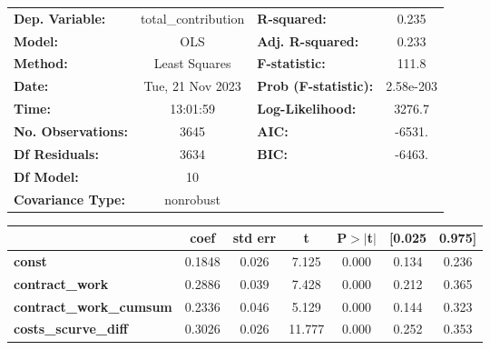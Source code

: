 \begin{center}
\begin{tabular}{lclc}
\toprule
\textbf{Dep. Variable:}                   & total\_contribution & \textbf{  R-squared:         } &     0.235   \\
\textbf{Model:}                           &         OLS         & \textbf{  Adj. R-squared:    } &     0.233   \\
\textbf{Method:}                          &    Least Squares    & \textbf{  F-statistic:       } &     111.8   \\
\textbf{Date:}                            &   Tue, 21 Nov 2023  & \textbf{  Prob (F-statistic):} & 2.58e-203   \\
\textbf{Time:}                            &       13:01:59      & \textbf{  Log-Likelihood:    } &    3276.7   \\
\textbf{No. Observations:}                &          3645       & \textbf{  AIC:               } &    -6531.   \\
\textbf{Df Residuals:}                    &          3634       & \textbf{  BIC:               } &    -6463.   \\
\textbf{Df Model:}                        &            10       & \textbf{                     } &             \\
\textbf{Covariance Type:}                 &      nonrobust      & \textbf{                     } &             \\
\bottomrule
\end{tabular}
\begin{tabular}{lcccccc}
                                          & \textbf{coef} & \textbf{std err} & \textbf{t} & \textbf{P$> |$t$|$} & \textbf{[0.025} & \textbf{0.975]}  \\
\midrule
\textbf{const}                            &       0.1848  &        0.026     &     7.125  &         0.000        &        0.134    &        0.236     \\
\textbf{contract\_work}                   &       0.2886  &        0.039     &     7.428  &         0.000        &        0.212    &        0.365     \\
\textbf{contract\_work\_cumsum}           &       0.2336  &        0.046     &     5.129  &         0.000        &        0.144    &        0.323     \\
\textbf{costs\_scurve\_diff}              &       0.3026  &        0.026     &    11.777  &         0.000        &        0.252    &        0.353     \\

\end{tabular}
\end{center}
